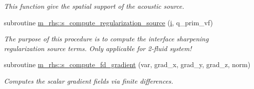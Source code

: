 \begin{DoxyCompactItemize}
\begin{DoxyCompactList}\small\item\em This function give the spatial support of the acoustic source. \end{DoxyCompactList}\item 
subroutine \hyperlink{namespacem__rhs_aa1cd3a5b83eabb0344ecae0cf321ca87}{m\+\_\+rhs\+::s\+\_\+compute\+\_\+regularization\+\_\+source} (\hyperlink{m__rhs_8f90_aaea4baed8fd8b780f6938f0dc1fb0f72}{i}, q\+\_\+prim\+\_\+vf)
\begin{DoxyCompactList}\small\item\em The purpose of this procedure is to compute the interface sharpening regularization source terms. Only applicable for 2-\/fluid system! \end{DoxyCompactList}\item 
subroutine \hyperlink{namespacem__rhs_abf11c6f8bb16f3c74cc0205b16d31e96}{m\+\_\+rhs\+::s\+\_\+compute\+\_\+fd\+\_\+gradient} (var, grad\+\_\+x, grad\+\_\+y, grad\+\_\+z, norm)
\begin{DoxyCompactList}\small\item\em Computes the scalar gradient fields via finite differences. \end{DoxyCompactList}\end{DoxyCompactItemize}
